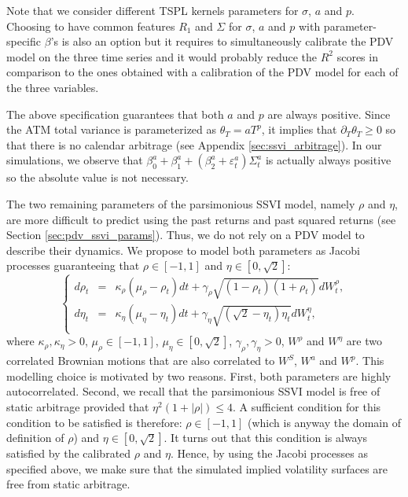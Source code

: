 \begin{remark}
    Note that we consider different TSPL kernels parameters for $\sigma$, $a$ and $p$. Choosing to have common features $R_1$ and $\Sigma$ for $\sigma$, $a$ and $p$ with parameter-specific $\beta$'s is also an option but it requires to simultaneously calibrate the PDV model on the three time series and it would probably reduce the $R^2$ scores in comparison to the ones obtained with a calibration of the PDV model for each of the three variables. \\
\end{remark}

\begin{remark}
    The above specification guarantees that both $a$ and $p$ are always positive. Since the ATM total variance is parameterized as $\theta_T=aT^p$, it implies that $\partial_T \theta_T\ge 0$ so that there is no calendar arbitrage (see Appendix \ref{sec:ssvi_arbitrage}). In our simulations, we observe that $\beta_0^a+\beta_1^a+(\beta_2^a+\varepsilon^a_t)\Sigma_t^a$ is actually always positive so the absolute value is not necessary. 
\end{remark}

The two remaining parameters of the parsimonious SSVI model, namely $\rho$ and $\eta$, are more difficult to predict using the past returns and past squared returns (see Section \ref{sec:pdv_ssvi_params}). Thus, we do not rely on a PDV model to describe their dynamics. We propose to model both parameters as Jacobi processes guaranteeing that $\rho \in [-1,1]$ and $\eta\in [0,\sqrt{2}]$:
\begin{equation}\label{eq:jacobi_processes}
    \left\{
    \begin{array}{rcl}
        d\rho_t &=& \kappa_{\rho}(\mu_\rho -\rho_t)dt  +\gamma_{\rho}\sqrt{(1-\rho_t)(1+\rho_t)} dW_t^{\rho}, \\
        d\eta_t &=& \kappa_{\eta}(\mu_{\eta} - \eta_t)dt +\gamma_{\eta}\sqrt{(\sqrt{2}-\eta_t)\eta_t} dW_t^{\eta}, \\
    \end{array}
    \right.
\end{equation}
where $\kappa_\rho,\kappa_{\eta}>0$, $\mu_{\rho}\in [-1,1]$, $\mu_{\eta}\in[0,\sqrt{2}]$, $\gamma_{\rho},\gamma_{\eta}>0$, $W^{\rho}$ and $W^{\eta}$ are two correlated Brownian motions that are also correlated to $W^S$, $W^a$ and $W^p$. This modelling choice is motivated by two reasons. First, both parameters are highly autocorrelated. Second, we recall that the parsimonious SSVI model is free of static arbitrage provided that $\eta^2(1+|\rho|) \le 4$. A sufficient condition for this condition to be satisfied is therefore: $\rho \in [-1,1]$ (which is anyway the domain of definition of $\rho$) and $\eta \in [0,\sqrt{2}]$. It turns out that this condition is always satisfied by the calibrated $\rho$ and $\eta$. Hence, by using the Jacobi processes as specified above, we make sure that the simulated implied volatility surfaces are free from static arbitrage. 


